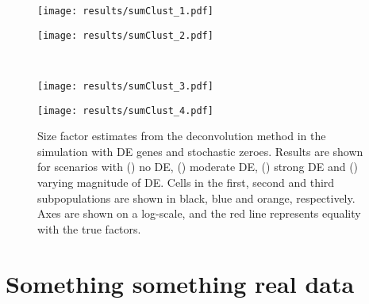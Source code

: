 \documentclass{article}
\begin{document}
\begin{figure}[bt]
\begin{minipage}{0.48\textwidth}
    \texttt{[image: results/sumClust\_1.pdf]}
    \subcaption{}\label{subfig:sumclust_1}
\end{minipage}
\begin{minipage}{0.48\textwidth}
    \texttt{[image: results/sumClust\_2.pdf]}
    \subcaption{}\label{subfig:sumclust_2}
\end{minipage}  \\ 
\begin{minipage}{0.48\textwidth}
    \texttt{[image: results/sumClust\_3.pdf]}
    \subcaption{}\label{subfig:sumclust_3}
\end{minipage}
\begin{minipage}{0.48\textwidth}
    \texttt{[image: results/sumClust\_4.pdf]}
    \subcaption{}\label{subfig:sumclust_4}
\end{minipage}
    \caption{
        Size factor estimates from the deconvolution method in the simulation with DE genes and stochastic zeroes.
        Results are shown for scenarios with () no DE, () moderate DE, 
                () strong DE and () varying magnitude of DE.
        Cells in the first, second and third subpopulations are shown in black, blue and orange, respectively.
        Axes are shown on a log-scale, and the red line represents equality with the true factors.
    }
    \label{fig:sim_cluster_DE}
\end{figure}




\section{Something something real data}



\end{document}
